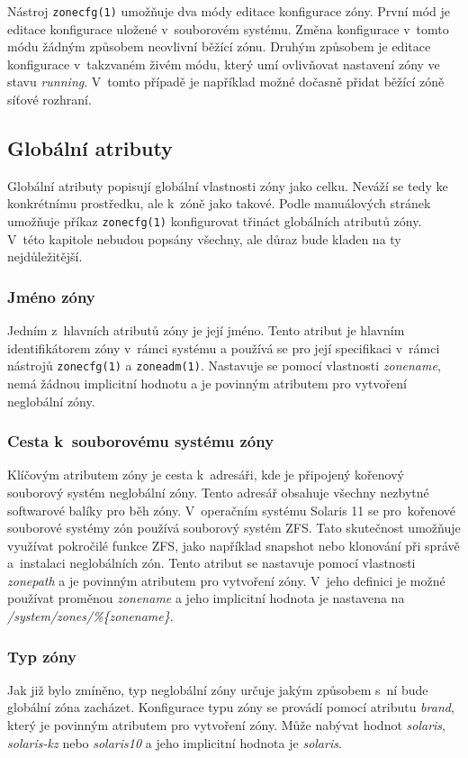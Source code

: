 Nástroj \verb|zonecfg(1)| umožňuje dva módy editace konfigurace zóny. První mód je editace konfigurace uložené v~souborovém
systému. Změna konfigurace v~tomto módu žádným způsobem neovlivní běžící zónu. Druhým způsobem je editace konfigurace v~takzvaném
živém módu, který umí ovlivňovat nastavení zóny ve stavu \textit{running}. V~tomto případě je například možné dočasně přidat
běžící zóně síťové rozhraní.
\subsection{Globální atributy}
\label{chapter:zones:configuration:global_attributes}
Globální atributy popisují globální vlastnosti zóny jako celku. Neváží se tedy ke konkrétnímu prostředku, ale k~zóně jako takové.
Podle manuálových stránek \cite{oracle:manpages:zonecfg} umožňuje příkaz \verb|zonecfg(1)| konfigurovat třináct globálních
atributů zóny. V~této kapitole nebudou popsány všechny, ale důraz bude kladen na ty nejdůležitější.
\subsubsection{Jméno zóny}
\label{chapter:zones:configuration:global_attributes:zonename}
Jedním z~hlavních atributů zóny je její jméno. Tento atribut je hlavním identifikátorem zóny v~rámci systému a používá se
pro její specifikaci v~rámci nástrojů \verb|zonecfg(1)| a \verb|zoneadm(1)|. Nastavuje se pomocí vlastnosti \textit{zonename},
nemá žádnou implicitní hodnotu a je povinným atributem pro vytvoření neglobální zóny.
\subsubsection{Cesta k~souborovému systému zóny}
\label{chapter:zones:configuration:global_attributes:zonepath}
Klíčovým atributem zóny je cesta k~adresáři, kde je připojený kořenový souborový systém neglobální zóny. Tento adresář obsahuje
všechny nezbytné softwarové balíky pro běh zóny. V~operačním systému Solaris 11 se pro~kořenové souborové systémy zón používá
souborový systém ZFS. Tato skutečnost umožňuje využívat pokročilé funkce ZFS, jako například snapshot nebo klonování při správě
a~instalaci neglobálních zón. Tento atribut se nastavuje pomocí vlastnosti \textit{zonepath} a je povinným atributem pro 
vytvoření zóny. V~jeho definici je možné používat proměnou \textit{zonename} a jeho implicitní hodnota je nastavena na
\textit{/system/zones/\%\{zonename\}}.
\subsubsection{Typ zóny}
\label{chapter:zones:configuration:global_attributes:brand}
Jak již bylo zmíněno, typ neglobální zóny určuje jakým způsobem s~ní bude globální zóna zacházet.
Konfigurace typu zóny se provádí pomocí atributu \textit{brand}, který je povinným atributem pro vytvoření zóny. Může nabývat
hodnot \textit{solaris}, \textit{solaris-kz} nebo \textit{solaris10} a jeho implicitní hodnota je \textit{solaris}.

